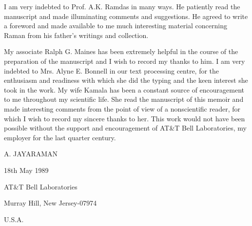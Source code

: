 I am very indebted to Prof. A.K. Ramdas in many ways. He patiently read the manuscript and made illuminating comments and suggestions. He agreed to write a foreword and made available to me much interesting material concerning Raman from his father's writings and collection.

My associate Ralph G. Maines has been extremely helpful in the course of the preparation of the manuscript and I wish to record my thanks to him. I am very indebted to Mrs. Alyne E. Bonnell in our text processing centre, for the enthusiasm and readiness with which she did the typing and the keen interest she took in the work. My wife Kamala has been a constant source of encouragement to me throughout my scientific life. She read the manuscript of this memoir and made interesting comments from the point of view of a nonscientific reader, for which I wish to record my sincere thanks to her. This work would not have been possible without the support and encouragement of AT\&T Bell Laboratories, my employer for the last quarter century.

\bigskip

\hfill A. JAYARAMAN

\noindent
18th May 1989

\noindent
AT\&T Bell Laboratories

\noindent
Murray Hill, New Jersey-07974

\noindent
U.S.A.
